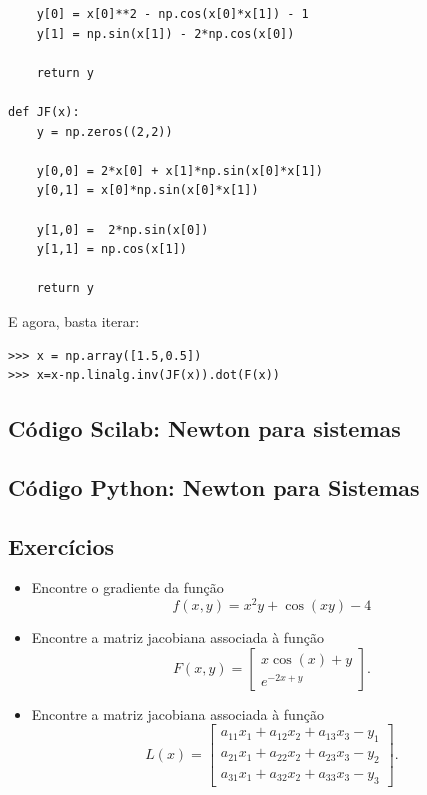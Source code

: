 \begin{sol}
\begin{verbatim}
    y[0] = x[0]**2 - np.cos(x[0]*x[1]) - 1
    y[1] = np.sin(x[1]) - 2*np.cos(x[0])
    
    return y

def JF(x):
    y = np.zeros((2,2))
    
    y[0,0] = 2*x[0] + x[1]*np.sin(x[0]*x[1])
    y[0,1] = x[0]*np.sin(x[0]*x[1])

    y[1,0] =  2*np.sin(x[0])
    y[1,1] = np.cos(x[1])

    return y
\end{verbatim}

E agora, basta iterar:
\begin{verbatim}
>>> x = np.array([1.5,0.5])
>>> x=x-np.linalg.inv(JF(x)).dot(F(x))
\end{verbatim}  
\fi
\end{sol}

\ifisscilab
\subsection{Código Scilab: Newton para sistemas}


\fi
\ifispython
\subsection{Código Python: Newton para Sistemas}


\fi

\subsection*{Exercícios}

\begin{exer}
\begin{itemize}
\item Encontre o gradiente da função $$f(x,y)=x^2y+\cos(xy)-4$$
\item Encontre a matriz jacobiana associada à função
$$F(x,y)=\left[\begin{array}{c}x\cos(x)+y\\ e^{-2x+y}\end{array} \right].$$
\item Encontre a matriz jacobiana associada à função
$$L(x)=\left[\begin{array}{c}
a_{11}x_1 + a_{12}x_2 +a_{13}x_3-y_1\\
a_{21}x_1 + a_{22}x_2 +a_{23}x_3-y_2\\
a_{31}x_1 + a_{32}x_2 +a_{33}x_3-y_3
\end{array}
 \right].$$
\end{itemize}

 \end{exer}


